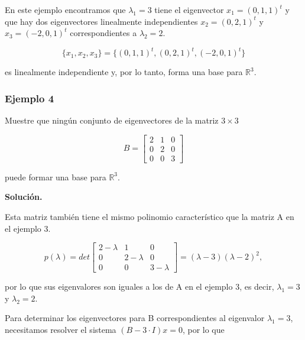 \documentclass{report}
\numberwithin{subsection}{section} %
\begin{document}
        En este ejemplo encontramos que $\lambda_1 = 3$ tiene el eigenvector $x_1 = (0, 1, 1)^t$ y que hay dos eigenvectores linealmente independientes $x_2 = (0, 2, 1)^t$ y $x_3 = (-2, 0, 1)^t$ correspondientes a $\lambda_2 = 2$.
    
        $$\{ x_1, x_2, x_3\} = \{(0, 1, 1)^t, (0, 2, 1)^t, (-2, 0, 1)^t \}$$
    
        es linealmente independiente y, por lo tanto, forma una base para $\mathbb{R}^3$.
        
\subsubsection*{Ejemplo 4}
        
        Muestre que ningún conjunto de eigenvectores de la matriz $3 \times 3$
    
        $$B = \begin{bmatrix}
            2 & 1 & 0 \\
            0 & 2 & 0 \\
            0 & 0 & 3
        \end{bmatrix}$$
    
        puede formar una base para $\mathbb{R}^3$.
    
        {\bf Solución.}
    
        Esta matriz también tiene el mismo polinomio característico que la matriz A en el ejemplo 3.
    
        $$p(\lambda) = det\begin{bmatrix}
                            2-\lambda & 1 & 0 \\
                            0 & 2-\lambda & 0 \\
                            0 & 0 & 3-\lambda
                        \end{bmatrix} = (\lambda  - 3)(\lambda  - 2)^2,$$
    
        por lo que sus eigenvalores son iguales a los de A en el ejemplo 3, es decir, $\lambda_1 = 3$ y $\lambda_2 = 2$.
        
        Para determinar los eigenvectores para B correspondientes al eigenvalor $\lambda_1 = 3$, necesitamos
        resolver el sistema $(B - 3\cdot I)x = 0$, por lo que
    
\end{document}
